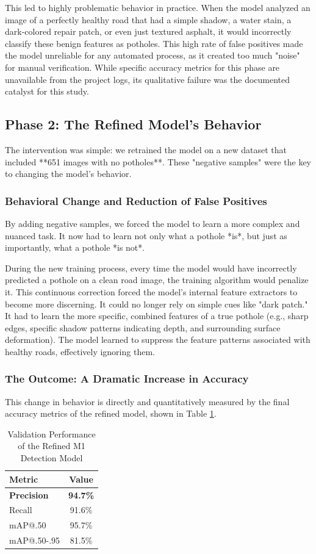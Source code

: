 \documentclass[twocolumn]{article}
\begin{document}
This led to highly problematic behavior in practice. When the model analyzed an image of a perfectly healthy road that had a simple shadow, a water stain, a dark-colored repair patch, or even just textured asphalt, it would incorrectly classify these benign features as potholes. This high rate of false positives made the model unreliable for any automated process, as it created too much "noise" for manual verification. While specific accuracy metrics for this phase are unavailable from the project logs, its qualitative failure was the documented catalyst for this study.

\subsection{Phase 2: The Refined Model's Behavior}
The intervention was simple: we retrained the model on a new dataset that included **651 images with no potholes**. These "negative samples" were the key to changing the model's behavior.

\subsubsection{Behavioral Change and Reduction of False Positives}
By adding negative samples, we forced the model to learn a more complex and nuanced task. It now had to learn not only what a pothole *is*, but just as importantly, what a pothole *is not*.

During the new training process, every time the model would have incorrectly predicted a pothole on a clean road image, the training algorithm would penalize it. This continuous correction forced the model's internal feature extractors to become more discerning. It could no longer rely on simple cues like "dark patch." It had to learn the more specific, combined features of a true pothole (e.g., sharp edges, specific shadow patterns indicating depth, and surrounding surface deformation). The model learned to suppress the feature patterns associated with healthy roads, effectively ignoring them.

\subsubsection{The Outcome: A Dramatic Increase in Accuracy}
This change in behavior is directly and quantitatively measured by the final accuracy metrics of the refined model, shown in Table \ref{tab:performance_refined}.

\begin{table}[H]
\centering
\caption{Validation Performance of the Refined M1 Detection Model}
\label{tab:performance_refined}
\begin{tabular}{@{}lc@{}}
\toprule
\textbf{Metric} & \textbf{Value} \\ \midrule
\textbf{Precision} & \textbf{94.7\%} \\
Recall & 91.6\% \\
mAP@.50 & 95.7\% \\
mAP@.50-.95 & 81.5\% \\ \bottomrule
\end{tabular}
\end{table}
\end{document}
